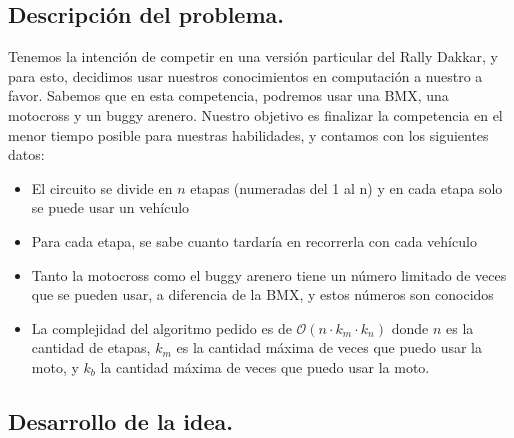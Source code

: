 \subsection{Descripción del problema.}

\vspace*{0.3cm}

Tenemos la intención de competir en una versión particular del Rally Dakkar, y para esto, decidimos usar nuestros conocimientos en computación a nuestro a favor. Sabemos que en esta competencia, podremos usar una BMX, una motocross y un buggy arenero. Nuestro objetivo es finalizar la competencia en el menor tiempo posible para nuestras habilidades, y contamos con los siguientes datos:

\begin{itemize}

	\item El circuito se divide en $n$ etapas (numeradas del 1 al n) y en cada etapa solo se puede usar un vehículo
	\item Para cada etapa, se sabe cuanto tardaría en recorrerla con cada vehículo
	\item Tanto la motocross como el buggy arenero tiene un número limitado de veces que se pueden usar, a diferencia de la BMX, y estos números son conocidos
	\item La complejidad del algoritmo pedido es de $\mathcal{O}(n \cdot k_{m} \cdot k_{n})$ donde $n$ es la cantidad de etapas, $k_{m}$ es la cantidad máxima de veces que puedo usar la moto, y $k_{b}$ la cantidad máxima de veces que puedo usar la moto.

\end{itemize}

\vspace*{0.6cm}
\subsection{Desarrollo de la idea.}

